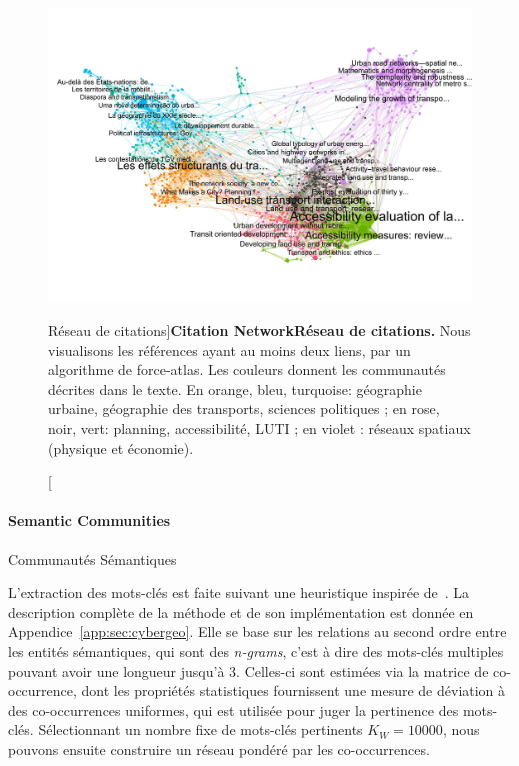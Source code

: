 \begin{figure}[!ht]
\includegraphics[width=\linewidth]{Figures/Final/2-2-2-fig-quantepistemo-citnw.jpg}
\caption[Citation Network][Réseau de citations]{\textbf{Citation Network}\label{fig:quantepistemo:citnw}}{\textbf{Réseau de citations.} Nous visualisons les références ayant au moins deux liens, par un algorithme de force-atlas. Les couleurs donnent les communautés décrites dans le texte. En orange, bleu, turquoise: géographie urbaine, géographie des transports, sciences politiques ; en rose, noir, vert: planning, accessibilité, LUTI ; en violet : réseaux spatiaux (physique et économie).\label{fig:quantepistemo:citnw}}
\end{figure}





\paragraph{Semantic Communities}{Communautés Sémantiques}


L'extraction des mots-clés est faite suivant une heuristique inspirée de~\cite{chavalarias2013phylomemetic}. La description complète de la méthode et de son implémentation est donnée en Appendice~\ref{app:sec:cybergeo}. Elle se base sur les relations au second ordre entre les entités sémantiques, qui sont des \emph{n-grams}, c'est à dire des mots-clés multiples pouvant avoir une longueur jusqu'à 3. Celles-ci sont estimées via la matrice de co-occurrence, dont les propriétés statistiques fournissent une mesure de déviation à des co-occurrences uniformes, qui est utilisée pour juger la pertinence des mots-clés. Sélectionnant un nombre fixe de mots-clés pertinents $K_W = 10000$, nous pouvons ensuite construire un réseau pondéré par les co-occurrences.


